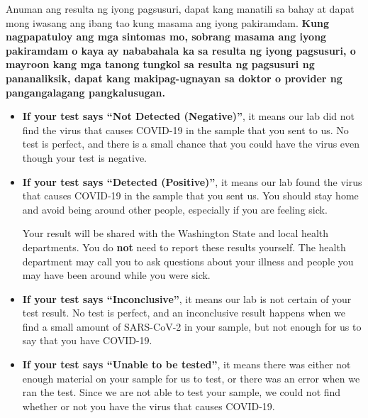 \documentclass[10pt]{article}
\begin{document}
Anuman ang resulta ng iyong pagsusuri, dapat kang manatili sa bahay at dapat
mong iwasang ang ibang tao kung masama ang iyong pakiramdam. \textbf{Kung
nagpapatuloy ang mga sintomas mo, sobrang masama ang iyong pakiramdam o kaya ay
nababahala ka sa resulta ng iyong pagsusuri, o mayroon kang mga tanong tungkol
sa resulta ng pagsusuri ng pananaliksik, dapat kang makipag-ugnayan sa doktor o
provider ng pangangalagang pangkalusugan.}

\begin{itemize}


\item

  \textbf{If your test says ``Not Detected (Negative)''}, it means our lab did not find the
  virus that causes COVID-19 in the sample that you sent to us. No test is
  perfect, and there is a small chance that you could have the virus even though
  your test is negative.

\item

  \textbf{If your test says ``Detected (Positive)''}, it means our
  lab found the virus that causes COVID-19 in the sample that you sent us. You
  should stay home and avoid being around other people, especially if you are
  feeling sick.

  Your result will be shared with the Washington State and local health
  departments. You do \textbf{not} need to report these results yourself. The
  health department may call you to ask questions about your illness and people
  you may have been around while you were sick.

\item

  \textbf{If your test says ``Inconclusive''}, it means our lab is not certain
  of your test result. No test is perfect, and an inconclusive result happens
  when we find a small amount of SARS-CoV-2 in your sample, but not enough for
  us to say that you have COVID-19.

\item

  \textbf{If your test says ``Unable to be tested''}, it means there was either
  not enough material on your sample for us to test, or there was an error when
  we ran the test. Since we are not able to test your sample, we could not find
  whether or not you have the virus that causes COVID-19.

\end{itemize}

\bigskip
\end{document}
